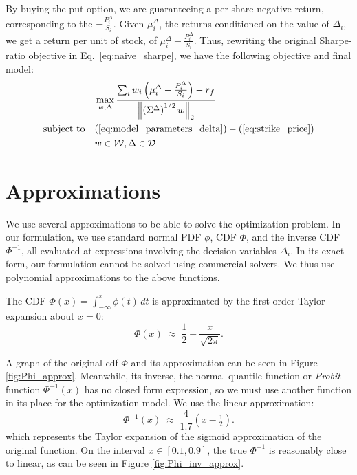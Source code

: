 \documentclass[11pt]{article}
\newcommand{\te}{\text}
\newcommand{\lp}{\left(}
\newcommand{\rp}{\right)}
\newcommand{\D}{\Delta}
\newcommand{\Pinv}{\Phi^{-1}}
\newcommand{\norm}[1]{\left\lVert#1\right\rVert}
\begin{document}
 By buying the put option, we are guaranteeing a per-share negative return, corresponding to the $-\frac{P_i^\D}{S_i}$. Given $\mu_i^\D$, the returns conditioned on the value of $\D_i$, we get a return per unit of stock, of $\mu_i^\D -\frac{P_i^\D}{S_i}$. Thus, rewriting the original Sharpe-ratio objective in Eq.~\ref{eq:naive_sharpe}, we have the following objective and final model:
\begin{equation}\label{eq:objective}
\begin{aligned}
        &\max_{w, \Delta} \frac{\sum_i w_i\lp\mu^\D_i - \frac{P_i^\D}{S_i}\rp-r_f}{\norm{\lp\Sigma^\D \rp^{1/2}w}_2}\\
    \te{subject to}\quad& (\ref{eq:model_parameters_delta})- (\ref{eq:strike_price}) \\
    &w\in \mathcal{W}, \Delta \in \mathcal{D}
\end{aligned}
\end{equation}

\section{Approximations}
We use several approximations to be able to solve the optimization problem. In our formulation, we use standard normal PDF $\phi$, CDF $\Phi$, and the inverse CDF $\Phi^{-1}$, all evaluated at expressions involving the decision variables $\Delta_i$. In its exact form, our formulation cannot be solved using commercial solvers. We thus use polynomial approximations to the above functions.

The CDF $\Phi(x) = \int_{-\infty}^x \phi(t)\,dt$ is approximated by the first-order Taylor expansion about $x = 0$:
\begin{equation}\label{eq:Phi_approx}
    \Phi(x) \;\approx\; \frac{1}{2} + \frac{x}{\sqrt{2\pi}}.
\end{equation}

A graph of the original cdf $\Phi$ and its approximation can be seen in Figure \ref{fig:Phi_approx}. Meanwhile, its inverse, the normal quantile function or \textit{Probit} function $\Pinv(x)$ has no closed form expression, so we must use another function in its place for the optimization model. We use the linear approximation:
\begin{equation}\label{eq:phi_inv_approx}
    \Phi^{-1}(x) \;\approx\; \frac{4}{1.7}\!\left(x - \tfrac{1}{2}\right).
\end{equation}
which represents the Taylor expansion of the sigmoid approximation of the original function. On the interval $x \in [0.1, 0.9]$, the true $\Phi^{-1}$ is reasonably close to linear, as can be seen in Figure \ref{fig:Phi_inv_approx}.
\end{document}
